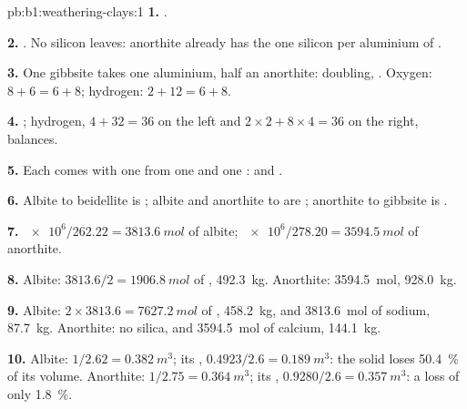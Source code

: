 \begin{solution}{pb:b1:weathering-clays:1}
\textbf{1.} .

\textbf{2.} . No silicon
leaves: anorthite already has the one silicon per aluminium of .

\textbf{3.} One gibbsite takes one aluminium, half an anorthite: doubling,
. Oxygen:
$8 + 6 = 6 + 8$; hydrogen: $2 + 12 = 6 + 8$.

\textbf{4.} ; %
hydrogen, $4 + 32 = 36$ on the left and $2\times2 + 8\times4 = 36$ on the
right, balances.

\textbf{5.} Each  comes with one  from one  and one
:
and .

\textbf{6.} Albite to beidellite is ; albite and anorthite to
 are ; anorthite to gibbsite is .

\textbf{7.} $\num{e6}/262.22 = \qty{3813.6}{mol}$ of albite;
$\num{e6}/278.20 = \qty{3594.5}{mol}$ of anorthite.

\textbf{8.} Albite: $3813.6/2 = \qty{1906.8}{mol}$ of ,
\qty{492.3}{kg}. Anorthite: \qty{3594.5}{mol}, \qty{928.0}{kg}.

\textbf{9.} Albite: $2\times3813.6 = \qty{7627.2}{mol}$ of ,
\qty{458.2}{kg}, and \qty{3813.6}{mol} of sodium, \qty{87.7}{kg}. Anorthite:
no silica, and \qty{3594.5}{mol} of calcium, \qty{144.1}{kg}.

\textbf{10.} Albite: $1/2.62 = \qty{0.382}{m^3}$; its ,
$0.4923/2.6 = \qty{0.189}{m^3}$: the solid loses \qty{50.4}{\percent} of its
volume. Anorthite: $1/2.75 = \qty{0.364}{m^3}$; its ,
$0.9280/2.6 = \qty{0.357}{m^3}$: a loss of only \qty{1.8}{\percent}.


\end{solution}
